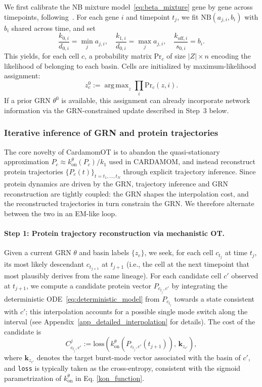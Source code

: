 \documentclass[a4paper, 11pt]{article}
\DeclareMathOperator*{\argmax}{arg\,max}
\theoremstyle{plain}
\theoremstyle{remark}
\begin{document}
We first calibrate the NB mixture model~\eqref{eq:beta_mixture} gene by gene across timepoints, following~\cite{ventre2023one}. For each gene $i$ and timepoint $t_j$, we fit $\mathrm{NB}(a_{j,i}, b_i)$ with $b_i$ shared across time, and set
\[
\frac{k_{0,i}}{d_{0,i}} = \min_j a_{j,i},\quad
\frac{k_{1,i}}{d_{0,i}} = \max_j a_{j,i},\quad
\frac{k_{\mathrm{off},i}}{s_{0,i}} = b_i.
\]
This yields, for each cell $c$, a probability matrix $\mathrm{Pr}_c$ of size $|Z|\times n$ encoding the likelihood of belonging to each basin. Cells are initialized by maximum-likelihood assignment:
\begin{equation}
\label{basins_argmax}
z_c^0 := \argmax_z \prod_i \mathrm{Pr}_c(z,i).
\end{equation}
If a prior GRN $\theta^0$ is available, this assignment can already incorporate network information via the GRN-constrained update described in Step~3 below.

\subsubsection{Iterative inference of GRN and protein trajectories}
\label{subsec:Trajectory_and_GRN_inference}

The core novelty of CardamomOT is to abandon the quasi-stationary approximation $P_c \approx k^{\theta}_{\mathrm{on}}(P_c)/k_1$ used in CARDAMOM, and instead reconstruct protein trajectories $\{P_c(t)\}_{t=t_1,\dots,t_N}$ through explicit trajectory inference. Since protein dynamics are driven by the GRN, trajectory inference and GRN reconstruction are tightly coupled: the GRN shapes the interpolation cost, and the reconstructed trajectories in turn constrain the GRN. We therefore alternate between the two in an EM-like loop.

\paragraph{Step 1: Protein trajectory reconstruction via mechanistic OT.}

Given a current GRN $\theta$ and basin labels $\{z_c\}$, we seek, for each cell $c_{t_j}$ at time $t_j$, its most likely descendant $c_{t_{j+1}}$ at $t_{j+1}$ (i.e., the cell at the next timepoint that most plausibly derives from the same lineage). For each candidate cell $c'$ observed at $t_{j+1}$, we compute a candidate protein vector $P_{c_{t_j},c'}$ by integrating the deterministic ODE~\eqref{eq:deterministic_model} from $P_{c_{t_j}}$ towards a state consistent with $c'$; this interpolation accounts for a possible single mode switch along the interval (see Appendix~\ref{app_detailed_interpolation} for details). The cost of the candidate is
\begin{equation}
    \label{cost_matrix}
    C^j_{c_{t_j},c'} := \mathrm{loss}\!\left(k_{\mathrm{on}}^{\theta}\!\left(P_{c_{t_j},c'}(t_{j+1})\right),\, \mathbf{k}_{z_{c'}}\right),
\end{equation}
where $\mathbf{k}_{z_{c'}}$ denotes the target burst-mode vector associated with the basin of $c'$, and \texttt{loss} is typically taken as the cross-entropy, consistent with the sigmoid parametrization of $k_{\mathrm{on}}^\theta$ in Eq. \eqref{kon_function}.
\end{document}
